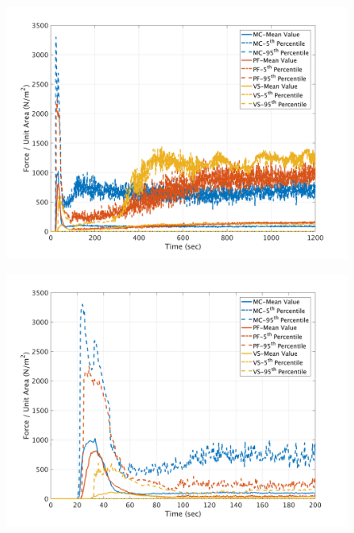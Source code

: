 \documentclass[a4paper,10pt]{article}
\begin{document}
\begin{figure}[H]
	\begin{minipage}[b]{0.5\linewidth}
	\centering
    \includegraphics[width=1\textwidth]{NetFAll/NetF5All.png}     
        \label{fig:NF5}
	\end{minipage}
	\begin{minipage}[b]{0.5\linewidth}
	\centering
    \includegraphics[width=1\textwidth]{NetFAll/NetF5All_z.png}
        \label{fig:NF5zoom}
	\end{minipage}
	

\end{figure}
\end{document}
